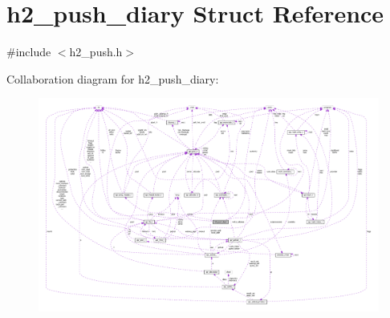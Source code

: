 \hypertarget{structh2__push__diary}{}\section{h2\+\_\+push\+\_\+diary Struct Reference}
\label{structh2__push__diary}


{\ttfamily \#include $<$h2\+\_\+push.\+h$>$}



Collaboration diagram for h2\+\_\+push\+\_\+diary\+:
\nopagebreak
\begin{figure}[H]
\begin{center}
\leavevmode
\includegraphics[width=350pt]{structh2__push__diary__coll__graph}
\end{center}
\end{figure}
